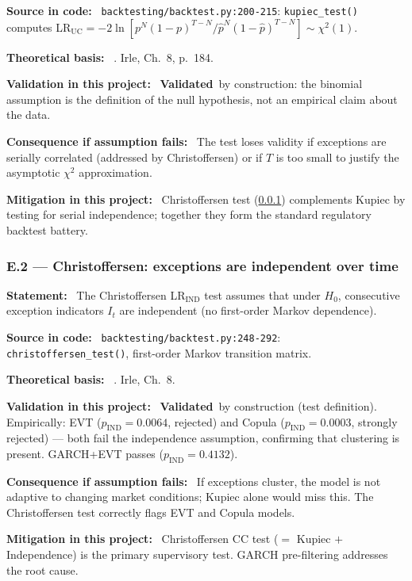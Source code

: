 \documentclass[11pt,a4paper]{article}
\newcommand{\asmfield}[1]{\medskip\noindent\textbf{#1:}\ }
\newcommand{\code}[1]{\texttt{#1}}
\newcommand{\validated}{\textbf{Validated}}
\begin{document}
\asmfield{Source in code}
\code{backtesting/backtest.py:200-215}: \code{kupiec\_test()} computes
LR$_{\mathrm{UC}} = -2\ln[p^N(1-p)^{T-N} / \hat{p}^N(1-\hat{p})^{T-N}] \sim \chi^2(1)$.

\asmfield{Theoretical basis}
\cite{Kupiec1995}. Irle, Ch.~8, p.~184.

\asmfield{Validation in this project}
\validated\ by construction: the binomial assumption is the definition of
the null hypothesis, not an empirical claim about the data.

\asmfield{Consequence if assumption fails}
The test loses validity if exceptions are serially correlated (addressed by
Christoffersen) or if $T$ is too small to justify the asymptotic $\chi^2$
approximation.

\asmfield{Mitigation in this project}
Christoffersen test (\cref{asm:E2}) complements Kupiec by testing for
serial independence; together they form the standard regulatory backtest
battery.

\subsubsection{E.2 --- Christoffersen: exceptions are independent over time}\label{asm:E2}

\asmfield{Statement}
The Christoffersen LR$_{\mathrm{IND}}$ test assumes that under $H_0$,
consecutive exception indicators $I_t$ are independent (no first-order
Markov dependence).

\asmfield{Source in code}
\code{backtesting/backtest.py:248-292}: \code{christoffersen\_test()},
first-order Markov transition matrix.

\asmfield{Theoretical basis}
\cite{Christoffersen1998}. Irle, Ch.~8.

\asmfield{Validation in this project}
\validated\ by construction (test definition). Empirically: EVT
($p_{\mathrm{IND}} = 0.0064$, rejected) and Copula ($p_{\mathrm{IND}} = 0.0003$,
strongly rejected) --- both fail the independence assumption, confirming
that clustering is present. GARCH+EVT passes ($p_{\mathrm{IND}} = 0.4132$).

\asmfield{Consequence if assumption fails}
If exceptions cluster, the model is not adaptive to changing market conditions;
Kupiec alone would miss this. The Christoffersen test correctly flags EVT
and Copula models.

\asmfield{Mitigation in this project}
Christoffersen CC test ($= $ Kupiec $+$ Independence) is the primary
supervisory test. GARCH pre-filtering addresses the root cause.
\end{document}
